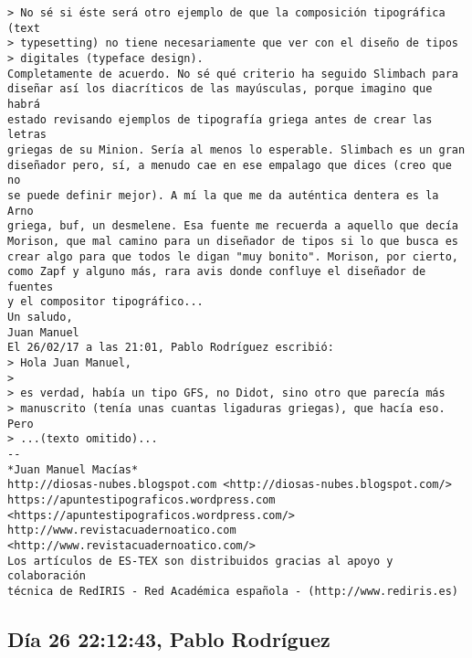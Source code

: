 \documentclass[a4paper,10pt]{article}
\begin{document}
\begin{lstlisting}
> No sé si éste será otro ejemplo de que la composición tipográfica (text
> typesetting) no tiene necesariamente que ver con el diseño de tipos
> digitales (typeface design).
Completamente de acuerdo. No sé qué criterio ha seguido Slimbach para 
diseñar así los diacríticos de las mayúsculas, porque imagino que habrá 
estado revisando ejemplos de tipografía griega antes de crear las letras 
griegas de su Minion. Sería al menos lo esperable. Slimbach es un gran 
diseñador pero, sí, a menudo cae en ese empalago que dices (creo que no 
se puede definir mejor). A mí la que me da auténtica dentera es la Arno 
griega, buf, un desmelene. Esa fuente me recuerda a aquello que decía 
Morison, que mal camino para un diseñador de tipos si lo que busca es 
crear algo para que todos le digan "muy bonito". Morison, por cierto, 
como Zapf y alguno más, rara avis donde confluye el diseñador de fuentes 
y el compositor tipográfico...
Un saludo,
Juan Manuel
El 26/02/17 a las 21:01, Pablo Rodríguez escribió:
> Hola Juan Manuel,
>
> es verdad, había un tipo GFS, no Didot, sino otro que parecía más
> manuscrito (tenía unas cuantas ligaduras griegas), que hacía eso. Pero
> ...(texto omitido)...
-- 
*Juan Manuel Macías*
http://diosas-nubes.blogspot.com <http://diosas-nubes.blogspot.com/>
https://apuntestipograficos.wordpress.com 
<https://apuntestipograficos.wordpress.com/>
http://www.revistacuadernoatico.com <http://www.revistacuadernoatico.com/>
Los artículos de ES-TEX son distribuidos gracias al apoyo y colaboración 
técnica de RedIRIS - Red Académica española - (http://www.rediris.es)

\end{lstlisting}

\subsection{Día 26 22:12:43, Pablo Rodríguez}
\end{document}
